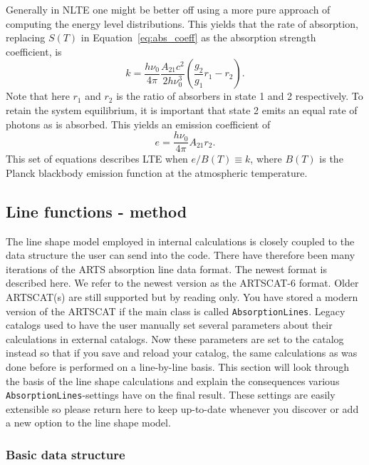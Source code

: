 Generally in NLTE one might be better off using a more pure approach
of computing the energy level distributions.  This yields that the
rate of absorption, replacing $S(T)$ in Equation~\ref{eq:abs_coeff}
as the absorption strength coefficient, is
\begin{equation}
 k = \frac{h\nu_0}{4\pi} \frac{A_{21}c^2}{2h\nu_0^3} \left(\frac{g_2}{g_1}r_1 - r_2\right).
\end{equation}
Note that here $r_1$ and $r_2$ is the ratio of absorbers in state 1 and 2 respectively.  To retain the system equilibrium, it is important that state 2
emits an equal rate of photons as is absorbed.  This yields an emission
coefficient of
\begin{equation}
 e = \frac{h\nu_0}{4\pi} A_{21} r_2.
\end{equation}
This set of equations describes LTE when $e/B(T) \equiv k$, where $B(T)$ is the
Planck blackbody emission function at the atmospheric temperature.

\subsection{Line functions - method \label{modern_lineshapes}}

The line shape model employed in internal calculations is closely coupled to
the data structure the user can send into the code.
There have therefore been many iterations of the ARTS absorption
line data format.  The
newest format is described here.  We refer to the newest version as the ARTSCAT-6
format.  Older ARTSCAT(s) are still supported but by reading only.  You have stored
a modern version of the ARTSCAT if the main class is called
\verb|AbsorptionLines|.  Legacy catalogs used to have the user manually set
several parameters about their calculations in external catalogs.  Now these
parameters are set to the catalog instead so that if you save and reload your
catalog, the same calculations as was done before is performed on a line-by-line
basis.  This section will look through the basis of the line shape calculations
and explain the consequences various \verb|AbsorptionLines|-settings have on the
final result.  These settings are easily extensible so please return here
to keep up-to-date whenever you discover or add a new option to the line shape model.

\subsubsection{Basic data structure}

